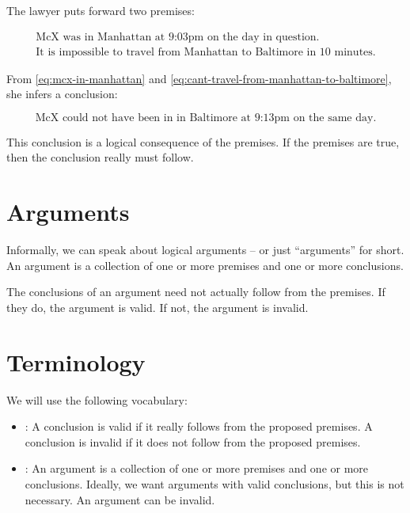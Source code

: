 \documentclass[../../../main.tex]{subfiles}
\begin{document}
\noindent
The lawyer puts forward two premises: 

\begin{align}
\label{eq:mcx-in-manhattan}\text{McX was in Manhattan at 9:03pm on the day in question.} \\
\label{eq:cant-travel-from-manhattan-to-baltimore}\text{It is impossible to travel from Manhattan to Baltimore in 10 minutes.}
\end{align}

\noindent
From \eqref{eq:mcx-in-manhattan} and \eqref{eq:cant-travel-from-manhattan-to-baltimore}, she infers a conclusion:

\begin{equation}
\text{McX could not have been in in Baltimore at 9:13pm on the same day.}
\end{equation}

\noindent
This conclusion is a logical consequence of the premises. If the premises are true, then the conclusion really must follow.


\section{Arguments}

Informally, we can speak about logical arguments -- or just ``arguments'' for short. An argument is a collection of one or more premises and one or more conclusions.

The conclusions of an argument need not actually follow from the premises. If they do, the argument is valid. If not, the argument is invalid.


\section{Terminology}

We will use the following vocabulary:

\begin{itemize}

  \item{
    :
    A conclusion is valid if it really follows from the proposed premises. A conclusion is invalid if it does not follow from the proposed premises.
   }
  
  \item{
    :
    An argument is a collection of one or more premises and one or more conclusions. Ideally, we want arguments with valid conclusions, but this is not necessary. An argument can be invalid.
  }

\end{itemize}
\end{document}
